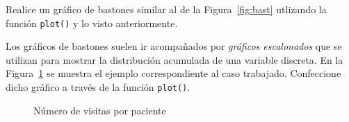 \documentclass{../prob}
\begin{document}
\begin{problema}
	\begin{parte}
	Realice un gráfico de bastones similar al de la Figura~\ref{fig:bast} utlizando la función \texttt{plot()} y lo visto anteriormente. 
	\end{parte}

	\begin{parte}
	Los gráficos de bastones suelen ir acompañados por  \textit{gráficos escalonados} que se utilizan para mostrar la distribución acumulada de una variable discreta. En la Figura~\ref{fig:bast2} se muestra el ejemplo correspondiente al caso trabajado. Confeccione dicho gráfico a través de la función \texttt{plot()}.\\
	
	\noindent{}
	\end{parte}

\begin{figure}[!ht]
    \centering
    
    \caption{Número de visitas por paciente}
    \label{fig:bast2}
\end{figure}	
	
	\end{problema}
	
\end{document}

